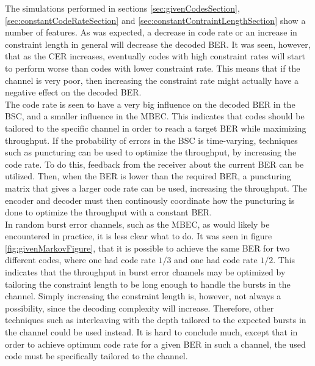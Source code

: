 The simulations performed in sections \ref{sec:givenCodesSection}, \ref{sec:constantCodeRateSection} and \ref{sec:constantContraintLengthSection} show a number of features. As was expected, a decrease in code rate or an increase in constraint length in general will decrease the decoded BER. It was seen, however, that as the CER increases, eventually codes with high constraint rates will start to perform worse than codes with lower constraint rate. This means that if the channel is very poor, then increasing the constraint rate might actually have a negative effect on the decoded BER.
\\[6pt]
The code rate is seen to have a very big influence on the decoded BER in the BSC, and a smaller influence in the MBEC. This indicates that codes should be tailored to the specific channel in order to reach a target BER while maximizing throughput. If the probability of errors in the BSC is time-varying, techniques such as puncturing can be used to optimize the throughput, by increasing the code rate. To do this, feedback from the receiver about the current BER can be utilized. Then, when the BER is lower than the required BER, a puncturing matrix that gives a larger code rate can be used, increasing the throughput. The encoder and decoder must then continously coordinate how the puncturing is done to optimize the throughput with a constant BER.
\\[6pt]
In random burst error channels, such as the MBEC, as would likely be encountered in practice, it is less clear what to do. It was seen in figure \ref{fig:givenMarkovFigure}, that it is possible to achieve the same BER for two different codes, where one had code rate $1/3$ and one had code rate $1/2$. This indicates that the  throughput in burst error channels may be optimized by tailoring the constraint length to be long enough to handle the bursts in the channel. Simply increasing the constraint length is, however, not always a possibility, since the decoding complexity will increase. Therefore, other techniques such as interleaving with the depth tailored to the expected bursts in the channel could be used instead. It is hard to conclude much, except that in order to achieve optimum code rate for a given BER in such a channel, the used code must be specifically tailored to the channel.
